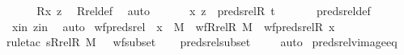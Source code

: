 \begin{isabellebody}
\ \ \isamarkupfalse%
\ \isamarkupfalse%
\ {\isachardoublequoteopen}R{\isacharparenleft}{\kern0pt}x{\isacharcomma}{\kern0pt}\ z{\isacharparenright}{\kern0pt}{\isachardoublequoteclose}\ \isamarkupfalse%
\ Rrel{\isacharunderscore}{\kern0pt}def\ \isamarkupfalse%
\ auto\ \isanewline
\ \ \isamarkupfalse%
\ \isamarkupfalse%
\ {\isachardoublequoteopen}{\isasymlangle}x{\isacharcomma}{\kern0pt}\ z{\isasymrangle}\ {\isasymin}\ preds{\isacharunderscore}{\kern0pt}rel{\isacharparenleft}{\kern0pt}R{\isacharcomma}{\kern0pt}\ t{\isacharparenright}{\kern0pt}{\isachardoublequoteclose}\ \isanewline
\ \ \ \ \isamarkupfalse%
\ preds{\isacharunderscore}{\kern0pt}rel{\isacharunderscore}{\kern0pt}def\ \isanewline
\ \ \ \ \isamarkupfalse%
\ xin\ zin\ \isamarkupfalse%
\ auto\isanewline
{}\isamarkupfalse%
%
\endisatagproof
{\isafoldproof}%
%
\isadelimproof
\isanewline
%
\endisadelimproof
\isanewline
{}\isamarkupfalse%
\ wf{\isacharunderscore}{\kern0pt}preds{\isacharunderscore}{\kern0pt}rel\ {\isacharcolon}{\kern0pt}\ {\isachardoublequoteopen}x\ {\isasymin}\ M\ {\isasymLongrightarrow}\ wf{\isacharparenleft}{\kern0pt}Rrel{\isacharparenleft}{\kern0pt}R{\isacharcomma}{\kern0pt}\ M{\isacharparenright}{\kern0pt}{\isacharparenright}{\kern0pt}\ {\isasymLongrightarrow}\ wf{\isacharparenleft}{\kern0pt}preds{\isacharunderscore}{\kern0pt}rel{\isacharparenleft}{\kern0pt}R{\isacharcomma}{\kern0pt}\ x{\isacharparenright}{\kern0pt}{\isacharparenright}{\kern0pt}{\isachardoublequoteclose}\ \isanewline
%
\isadelimproof
\ \ %
\endisadelimproof
%
\isatagproof
{}\isamarkupfalse%
{\isacharparenleft}{\kern0pt}rule{\isacharunderscore}{\kern0pt}tac\ s{\isacharequal}{\kern0pt}{\isachardoublequoteopen}Rrel{\isacharparenleft}{\kern0pt}R{\isacharcomma}{\kern0pt}\ M{\isacharparenright}{\kern0pt}{\isachardoublequoteclose}\ \ \ wf{\isacharunderscore}{\kern0pt}subset{\isacharparenright}{\kern0pt}\isanewline
\ \ \isamarkupfalse%
\ preds{\isacharunderscore}{\kern0pt}rel{\isacharunderscore}{\kern0pt}subset\ \isanewline
\ \ \isamarkupfalse%
\ auto%
\endisatagproof
{\isafoldproof}%
%
\isadelimproof
\isanewline
%
\endisadelimproof
\isanewline
{}\isamarkupfalse%
\ preds{\isacharunderscore}{\kern0pt}rel{\isacharunderscore}{\kern0pt}vimage{\isacharunderscore}{\kern0pt}eq\ {\isacharcolon}{\kern0pt}\ \isanewline

\end{isabellebody}
